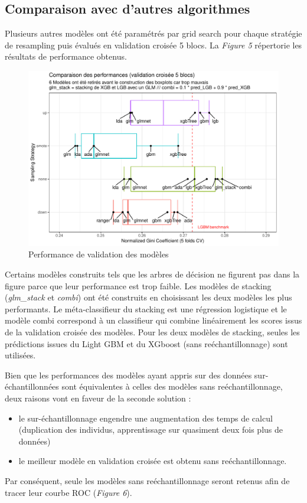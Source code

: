 \documentclass[french]{article}
\begin{document}
\begin{multicols}{2}
\subsection{Comparaison avec d'autres algorithmes}

Plusieurs autres modèles ont été paramétrés par \og grid search \fg{} pour chaque stratégie de resampling puis évalués en validation croisée 5 blocs. La \emph{Figure 5} répertorie les résultats de performance obtenus.

\begin{figure}[H] \centering
  \includegraphics[width = \columnwidth]{img/results}
  \caption{Performance de validation des modèles}
\end{figure}

Certains modèles construits tels que les arbres de décision ne figurent pas dans la figure parce que leur performance est trop faible. Les modèles de stacking (\emph{glm\_stack} et \emph{combi}) ont été construits en choisissant les deux modèles les plus performants. Le méta-classifieur du stacking est une régression logistique et le modèle \og combi \fg{} correspond à un classifieur qui combine linéairement les scores issus de la validation croisée des modèles. Pour les deux modèles de stacking, seules les prédictions issues du Light GBM et du XGboost (sans reéchantillonnage) sont utilisées.

Bien que les performances des modèles ayant appris sur des données sur-échantillonnées sont équivalentes à celles des modèles sans reéchantillonnage, deux raisons vont en faveur de la seconde solution :
\begin{itemize}
    \item le sur-échantillonnage engendre une augmentation des temps de calcul (duplication des individus, apprentissage sur quasiment deux fois plus de données)
    \item le meilleur modèle en validation croisée est obtenu sans reéchantillonnage.
\end{itemize}
Par conséquent, seule les modèles sans reéchantillonnage seront retenus afin de tracer leur courbe ROC (\emph{Figure 6}).


\end{multicols}
\end{document}
